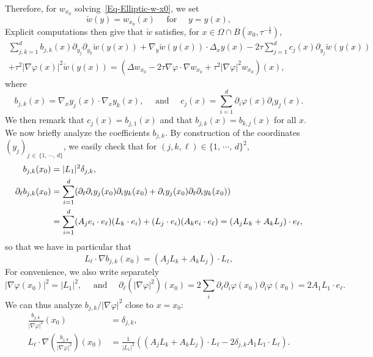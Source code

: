 \documentclass[10pt]{amsart}
\theoremstyle{definition}\newtheorem{defi}[theo]{Definition}\newtheorem{rema}[theo]{Remark}\newtheorem{exam}[theo]{Example}\newtheorem{exem}[theo]{Example}\newtheorem{nota}[theo]{Notation}
\begin{document}
Therefore, for $w_{x_0}$ solving~\eqref{Eq-Elliptic-w-x0}, we set
\begin{equation*}
\check w(y) = w_{x_0}(x) \quad \text{ for } \quad y = y(x),
\end{equation*}
Explicit computations then give that $\check w$ satisfies, for $x \in \Omega \cap B(x_0, \tau^{-\frac{1}{3}}), $
\begin{multline}\label{Eq-Tilde-w}
 \sum_{j,k = 1}^d b_{j,k}(x) \partial_{y_j} \partial_{y_k} \check w(y(x)) + \nabla_y \check w(y(x)) \cdot \Delta_x y(x) - 2 \tau \sum_{j = 1}^d c_j (x) \partial_{y_j} \check w(y(x))
\\
+
\tau^2 |\nabla \varphi(x)|^2 \check w (y(x)) =
\left(\Delta w_{x_0} - 2\tau \nabla \varphi \cdot \nabla w_{x_0} + \tau^2 |\nabla \varphi|^2 w_{x_0} \right)(x),
\end{multline}
where
\[
b_{j,k}(x) = \nabla_x y_j(x) \cdot \nabla_x y_k(x), \quad \text{ and } \quad c_j (x) = \sum_{i = 1}^d \partial_i \varphi(x) \partial_i y_j(x).
\]
We then remark that $c_j(x) = b_{j,1}(x)$ and that $b_{j,k}(x) = b_{k,j}(x)$ for all $x$. We now briefly analyze the coefficients $b_{j,k}$. By construction of the coordinates $(y_j)_{j \,\in\,\{1,\, \cdots,\, d\}}$, we easily check that for $(j,k,\ell) \in \{1,\, \cdots,\, d\}^2$,
\begin{align*}
b_{j,k}(x_0) &= |L_1|^2 \delta_{j,k},
\\
\partial_\ell b_{j,k} (x_0) & = \sum_{i = 1}^d (\partial_\ell \partial_i y_j (x_0) \partial_i y_k(x_0) + \partial_i y_j(x_0) \partial_\ell \partial_i y_k(x_0))
\notag
\\
& = \sum_{i = 1}^d (A_j e_i \cdot e_\ell) (L_k \cdot e_i)+ (L_j \cdot e_i) (A_k e_i \cdot e_\ell) = \left(A_j L_k + A_k L_j\right) \cdot e_\ell,
\end{align*}
so that we have in particular that
\[
L_\ell \cdot \nabla b_{j,k} (x_0)= \left(A_j L_k + A_k L_j\right) \cdot L_\ell,
\]
For convenience, we also write separately
\[
|\nabla \varphi(x_0)|^2 = |L_1|^2,
\quad
\text{ and }
\quad
\partial_\ell \left(|\nabla \varphi|^2\right)(x_0) = 2 \sum_{i} \partial_\ell \partial_i \varphi(x_0) \partial_i \varphi(x_0) = 2 A_1 L_1 \cdot e_\ell.
\]
We can thus analyze $b_{j,k} / |\nabla \varphi|^2$ close to $x = x_0$:
\begin{align*}
\frac{b_{j,k}}{|\nabla \varphi|^2} (x_0) & = \delta_{j,k},
\\
L_\ell \cdot \nabla \left(\frac{b_{j,k}}{|\nabla \varphi|^2} \right) (x_0) & =
\frac{1}{|L_1|^2} \left(\left(A_j L_k + A_k L_j\right) \cdot L_\ell -2 \delta_{j,k} A_1 L_1 \cdot L_\ell \right).
\end{align*}
\end{document}
